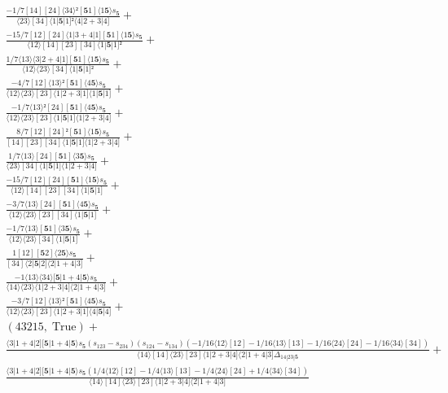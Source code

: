 \documentclass[varwidth, border=5pt]{standalone}
\begin{document}
\begin{my}
$\begin{gathered}
\scriptscriptstyle\frac{-1/7[14][24]⟨34⟩²[𝟓1]⟨1𝟓⟩s_{𝟓}}{⟨23⟩[34]⟨1|𝟓|1]²⟨4|2+3|4]} +\\
\scriptscriptstyle\frac{-15/7[12][24]⟨1|3+4|1][𝟓1]⟨1𝟓⟩s_{𝟓}}{⟨12⟩[14][23][34]⟨1|𝟓|1]²} +\\
\scriptscriptstyle\frac{1/7⟨13⟩⟨3|2+4|1][𝟓1]⟨1𝟓⟩s_{𝟓}}{⟨12⟩⟨23⟩[34]⟨1|𝟓|1]²} +\\
\scriptscriptstyle\frac{-4/7[12]⟨13⟩²[𝟓1]⟨4𝟓⟩s_{𝟓}}{⟨12⟩⟨23⟩[23]⟨1|2+3|1]⟨1|𝟓|1]} +\\
\scriptscriptstyle\frac{-1/7⟨13⟩²[24][𝟓1]⟨4𝟓⟩s_{𝟓}}{⟨12⟩⟨23⟩[23]⟨1|𝟓|1]⟨1|2+3|4]} +\\
\scriptscriptstyle\frac{8/7[12][24]²[𝟓1]⟨1𝟓⟩s_{𝟓}}{[14][23][34]⟨1|𝟓|1]⟨1|2+3|4]} +\\
\scriptscriptstyle\frac{1/7⟨13⟩[24][𝟓1]⟨3𝟓⟩s_{𝟓}}{⟨23⟩[34]⟨1|𝟓|1]⟨1|2+3|4]} +\\
\scriptscriptstyle\frac{-15/7[12][24][𝟓1]⟨1𝟓⟩s_{𝟓}}{⟨12⟩[14][23][34]⟨1|𝟓|1]} +\\
\scriptscriptstyle\frac{-3/7⟨13⟩[24][𝟓1]⟨4𝟓⟩s_{𝟓}}{⟨12⟩⟨23⟩[23][34]⟨1|𝟓|1]} +\\
\scriptscriptstyle\frac{-1/7⟨13⟩[𝟓1]⟨3𝟓⟩s_{𝟓}}{⟨12⟩⟨23⟩[34]⟨1|𝟓|1]} +\\
\scriptscriptstyle\frac{1[12][𝟓2]⟨2𝟓⟩s_{𝟓}}{[34]⟨2|𝟓|2]⟨2|1+4|3]} +\\
\scriptscriptstyle\frac{-1⟨13⟩⟨34⟩[𝟓|1+4|𝟓⟩s_{𝟓}}{⟨14⟩⟨23⟩⟨1|2+3|4]⟨2|1+4|3]} +\\
\scriptscriptstyle\frac{-3/7[12]⟨13⟩²[𝟓1]⟨4𝟓⟩s_{𝟓}}{⟨12⟩⟨23⟩[23]⟨1|2+3|1]⟨4|𝟓|4]} +\\
\scriptscriptstyle(43215,\;\text{True}) +\\
\scriptscriptstyle\frac{⟨3|1+4|2][𝟓|1+4|𝟓⟩s_{𝟓}(s_{123}-s_{234})(s_{124}-s_{134})(-1/16⟨12⟩[12]-1/16⟨13⟩[13]-1/16⟨24⟩[24]-1/16⟨34⟩[34])}{⟨14⟩[14]⟨23⟩[23]⟨1|2+3|4]⟨2|1+4|3]Δ_{14|23|𝟓}} +\\
\scriptscriptstyle\frac{⟨3|1+4|2][𝟓|1+4|𝟓⟩s_{𝟓}(1/4⟨12⟩[12]-1/4⟨13⟩[13]-1/4⟨24⟩[24]+1/4⟨34⟩[34])}{⟨14⟩[14]⟨23⟩[23]⟨1|2+3|4]⟨2|1+4|3]} \phantom{+}
\end{gathered}$
\end{my}
\end{document}
